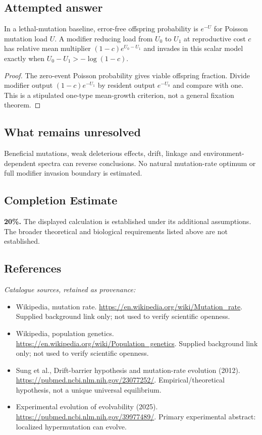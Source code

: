 \documentclass[11pt]{article}
\begin{document}
\subsection{Attempted answer}
\begin{proposition}
In a lethal-mutation baseline, error-free offspring probability is $e^{-U}$ for Poisson mutation load $U$. A modifier reducing load from $U_0$ to $U_1$ at reproductive cost $c$ has relative mean multiplier $(1-c)e^{U_0-U_1}$ and invades in this scalar model exactly when $U_0-U_1>-\log(1-c)$.
\end{proposition}
\begin{proof}
The zero-event Poisson probability gives viable offspring fraction. Divide modifier output $(1-c)e^{-U_1}$ by resident output $e^{-U_0}$ and compare with one. This is a stipulated one-type mean-growth criterion, not a general fixation theorem.
\end{proof}
\subsection{What remains unresolved}
Beneficial mutations, weak deleterious effects, drift, linkage and environment-dependent spectra can reverse conclusions. No natural mutation-rate optimum or full modifier invasion boundary is estimated.
\subsection{Completion Estimate}
\textbf{20\%.} The displayed calculation is established under its additional assumptions. The broader theoretical and biological requirements listed above are not established.
\subsection{References}
\noindent\emph{Catalogue sources, retained as provenance:}
\begin{itemize}
\item Wikipedia, mutation rate. \url{https://en.wikipedia.org/wiki/Mutation_rate}. Supplied background link only; not used to verify scientific openness.
\item Wikipedia, population genetics. \url{https://en.wikipedia.org/wiki/Population_genetics}. Supplied background link only; not used to verify scientific openness.
\item Sung et al., Drift-barrier hypothesis and mutation-rate evolution (2012). \url{https://pubmed.ncbi.nlm.nih.gov/23077252/}. Empirical/theoretical hypothesis, not a unique universal equilibrium.
\item Experimental evolution of evolvability (2025). \url{https://pubmed.ncbi.nlm.nih.gov/39977489/}. Primary experimental abstract: localized hypermutation can evolve.
\end{itemize}
\end{document}

